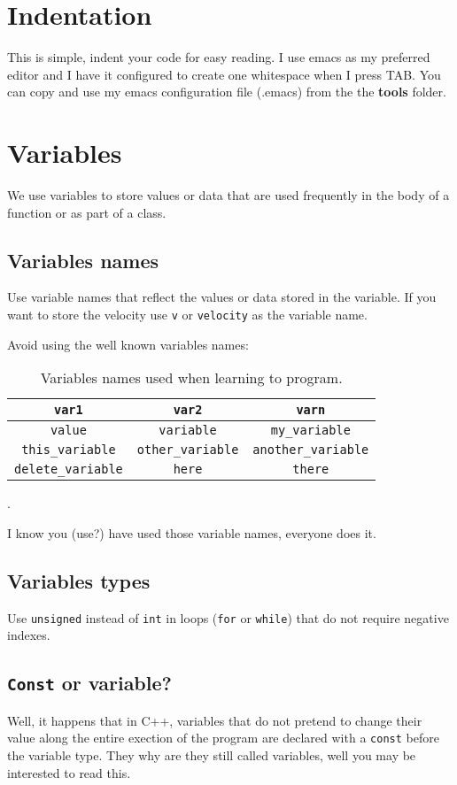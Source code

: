 \documentclass[12pt,a4paper,final]{report} %
\begin{document}
\section{Indentation}
This is simple, indent your code for easy reading. I use emacs as my
preferred editor and I have it configured to create one whitespace
when I press TAB. You can copy and use my emacs configuration file
(.emacs) from the the \textbf{tools} folder.

\section{Variables}
We use variables to store values or data that are used frequently in
the body of a function or as part of a class.

\subsection{Variables names}
Use variable names that reflect the values or data stored in the
variable. If you want to store the velocity use \texttt{v} or
\texttt{velocity} as the variable name.

Avoid using the well known variables names:
\begin{table}
  \centering
  \begin{tabular}{|c|c|c|}
    \hline
    \texttt{var1} & \texttt{var2} & \texttt{varn}\\
    \hline
    \texttt{value} & \texttt{variable} & \texttt{my\_variable}\\
    \hline
    \texttt{this\_variable} & \texttt{other\_variable} &
    \texttt{another\_variable}\\
    \hline
    \texttt{delete\_variable} &  \texttt{here} & \texttt{there}\\
    \hline
\end{tabular}
\label{tbl:variables_names_when_learning_to_program}
\caption{Variables names used when learning to program.}.
\end{table}
I know you (use?) have used those variable names, everyone does it.

\subsection{Variables types}
Use \texttt{unsigned} instead of \texttt{int} in loops (\texttt{for}
or \texttt{while}) that do not require negative indexes.

\subsection{\texttt{Const} or variable?}
Well, it happens that in C++, variables that do not pretend to change
their value along the entire exection of the program are declared with
a \texttt{const} before the variable type. They why are they still
called variables, well you may be interested to read this.
\end{document}
